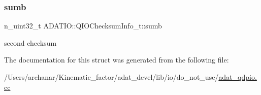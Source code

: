 \subsubsection{\texorpdfstring{sumb}{sumb}}
{\footnotesize\ttfamily n\+\_\+uint32\+\_\+t A\+D\+A\+T\+I\+O\+::\+Q\+I\+O\+Checksum\+Info\+\_\+t\+::sumb}

second checksum 

The documentation for this struct was generated from the following file\+:\begin{DoxyCompactItemize}
\item 
/\+Users/archanar/\+Kinematic\+\_\+factor/adat\+\_\+devel/lib/io/do\+\_\+not\+\_\+use/\mbox{\hyperlink{adat__qdpio_8cc}{adat\+\_\+qdpio.\+cc}}\end{DoxyCompactItemize}

